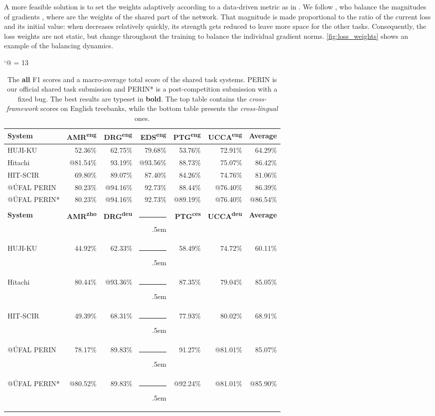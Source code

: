 \documentclass[11pt,a4paper]{article}
\begin{document}
A more feasible solution is to set the weights adaptively according to a data-driven metric as in \citet{kendall2018multi}. We follow \citet{chen2018gradnorm}, who balance the magnitudes of gradients , where  are the weights of the shared part of the network. That magnitude is made proportional to the ratio of the current loss and its initial value: when  decreases relatively quickly, its strength gets reduced to leave more space for the other tasks. Consequently, the loss weights  are not static, but change throughout the training to balance the individual gradient norms. \autoref{fig:loss_weights} shows an example of the balancing dynamics.
 \begin{table*}[t]
\small
\centering
\def\-{\rule[.5ex]{2em}{0.5pt}\kern.5em}
\def\={\rule[.5ex]{2em}{1pt}\kern.5em}
\catcode`@ = 13
\begin{tabular}{@{}lrrrrrr@{}}
\toprule
\textbf{System} & \textbf{AMR\textsuperscript{eng}} & \textbf{DRG\textsuperscript{eng}} & \textbf{EDS\textsuperscript{eng}} & \textbf{PTG\textsuperscript{eng}} & \textbf{UCCA\textsuperscript{eng}} & \textbf{Average} \\ \midrule
HUJI-KU \cite{Arv:Cui:Her:20} & 52.36\% & 62.75\% & 79.68\% & 53.76\% & 72.91\% & 64.29\% \\
Hitachi \cite{Oza:Mor:Kor:20} &@81.54\% & 93.19\% &@93.56\% & 88.73\% & 75.07\% & 86.42\% \\
HIT-SCIR \cite{Dou:Fen:Ji:20} & 69.80\% & 89.07\% & 87.40\% & 84.26\% & 74.76\% & 81.06\% \\
@ÚFAL PERIN   & 80.23\% &@94.16\% & 92.73\% & 88.44\% &@76.40\% & 86.39\% \\
@ÚFAL PERIN*  & 80.23\% &@94.16\% & 92.73\% &@89.19\% &@76.40\% &@86.54\% \\ \midrule
 &  &  &  &  &  &  \\ \midrule[1pt]
\textbf{System} & \textbf{AMR\textsuperscript{zho}} & \textbf{DRG\textsuperscript{deu}} & \= & \textbf{PTG\textsuperscript{ces}} & \textbf{UCCA\textsuperscript{deu}} & \textbf{Average} \\ \midrule
HUJI-KU \cite{Arv:Cui:Her:20} & 44.92\% & 62.33\% & \- & 58.49\% & 74.72\% & 60.11\% \\
Hitachi \cite{Oza:Mor:Kor:20} & 80.44\% &@93.36\% & \- & 87.35\% & 79.04\% & 85.05\% \\
HIT-SCIR \cite{Dou:Fen:Ji:20} & 49.39\% & 68.31\% & \- & 77.93\% & 80.02\% & 68.91\% \\
@ÚFAL PERIN   & 78.17\% & 89.83\% & \- & 91.27\% &@81.01\% & 85.07\% \\
@ÚFAL PERIN*  &@80.52\% & 89.83\% & \- &@92.24\% &@81.01\% &@85.90\% \\ \bottomrule
\end{tabular}
\caption{The \textbf{all} F1 scores and a macro-average total score of the shared task systems. PERIN is our official shared task submission and PERIN* is a post-competition submission with a fixed bug. The best results are typeset in \textbf{bold}. The top table contains the  \emph{cross-framework} scores on English treebanks, while the bottom table presents the \emph{cross-lingual} ones.}
\label{tab:framework_result}
\end{table*}
 
\end{document}
